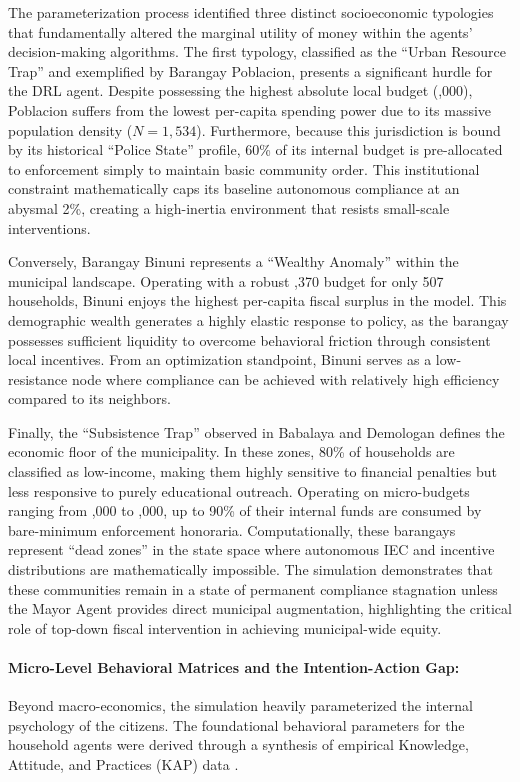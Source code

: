 The parameterization process identified three distinct socioeconomic typologies that fundamentally altered the marginal utility of money within the agents' decision-making algorithms. The first typology, classified as the ``Urban Resource Trap'' and exemplified by Barangay Poblacion, presents a significant hurdle for the DRL agent. Despite possessing the highest absolute local budget (,000), Poblacion suffers from the lowest per-capita spending power due to its massive population density ($N=1,534$). Furthermore, because this jurisdiction is bound by its historical ``Police State'' profile, 60\% of its internal budget is pre-allocated to enforcement simply to maintain basic community order. This institutional constraint mathematically caps its baseline autonomous compliance at an abysmal 2\%, creating a high-inertia environment that resists small-scale interventions.

Conversely, Barangay Binuni represents a ``Wealthy Anomaly'' within the municipal landscape. Operating with a robust ,370 budget for only 507 households, Binuni enjoys the highest per-capita fiscal surplus in the model. This demographic wealth generates a highly elastic response to policy, as the barangay possesses sufficient liquidity to overcome behavioral friction through consistent local incentives. From an optimization standpoint, Binuni serves as a low-resistance node where compliance can be achieved with relatively high efficiency compared to its neighbors.

Finally, the ``Subsistence Trap'' observed in Babalaya and Demologan defines the economic floor of the municipality. In these zones, 80\% of households are classified as low-income, making them highly sensitive to financial penalties but less responsive to purely educational outreach. Operating on micro-budgets ranging from ,000 to ,000, up to 90\% of their internal funds are consumed by bare-minimum enforcement honoraria. Computationally, these barangays represent ``dead zones'' in the state space where autonomous IEC and incentive distributions are mathematically impossible. The simulation demonstrates that these communities remain in a state of permanent compliance stagnation unless the Mayor Agent provides direct municipal augmentation, highlighting the critical role of top-down fiscal intervention in achieving municipal-wide equity.

\paragraph{Micro-Level Behavioral Matrices and the Intention-Action Gap:}
Beyond macro-economics, the simulation heavily parameterized the internal psychology of the citizens. The foundational behavioral parameters for the household agents were derived through a synthesis of empirical Knowledge, Attitude, and Practices (KAP) data \citep{Paigalan2025}. 


